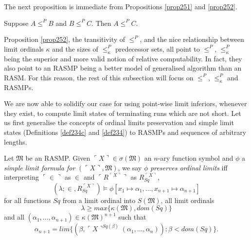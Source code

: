 \documentclass[12pt]{article}
\numberwithin{equation}{section}
\begin{document}
The next proposition is immediate from Propositions \ref{prop251} and \ref{prop252}.

\begin{prop}
Suppose $A \leq^P B$ and $B \leq^P C$. Then $A \leq^P C$.
\end{prop} 

Proposition \ref{prop252}, the transitivity of $\leq^P$, and the nice relationship between limit ordinals $\kappa$ and the sizes of $\leq^P_{\kappa}$ predecessor sets, all point to $\leq^P$, $\leq^P_{\kappa}$ being the superior and more valid notion of relative computability. In fact, they also point to an RASMP being a better model of generalised algorithm than an RASM. For this reason, the rest of this subsection will focus on $\leq^P$, $\leq^P_{\kappa}$ and RASMPs.

We are now able to solidify our case for using point-wise limit inferiors, whenever they exist, to compute limit states of terminating runs which are not short. Let us first generalise the concepts of ordinal limits preservation and simple limit states (Definitions \ref{def234c} and \ref{def234}) to RASMPs and sequences of arbitrary lengths.

\begin{defi}\label{257c}
Let $\mathfrak{M}$ be an RASMP. Given $\ulcorner X \urcorner \in \sigma(\mathfrak{M})$ an $n$-ary function symbol and $\phi$ a \emph{simple limit formula for} $(\ulcorner X \urcorner, \mathfrak{M})$, we say $\phi$ \emph{preserves ordinal limits} iff interpreting $\ulcorner \in \urcorner$ as $\in$ and $\ulcorner R^{\ulcorner X \urcorner} \urcorner$ as $R_{Sq}^{\ulcorner X \urcorner}$, 
\begin{equation*}
    (\lambda; \in, R_{Sq}^{\ulcorner X \urcorner}) \models \phi[x_1 \mapsto \alpha_1, \dots, x_{n+1} \mapsto \alpha_{n+1}]
\end{equation*}
for all functions $Sq$ from a limit ordinal into $S(\mathfrak{M})$, all limit ordinals 
\begin{equation*}
    \lambda \geq max\{\kappa(\mathfrak{M}), dom(Sq)\}
\end{equation*}
and all $(\alpha_1, \dots, \alpha_{n+1}) \in \kappa(\mathfrak{M})^{n+1}$ such that 
\begin{equation*}
    \alpha_{n+1} = lim \{(\beta, \ulcorner X \urcorner^{Sq(\beta)}(\alpha_1, \dots, \alpha_n)) : \beta < dom(Sq)\} \text{.}
\end{equation*}
\end{defi}
\end{document}
